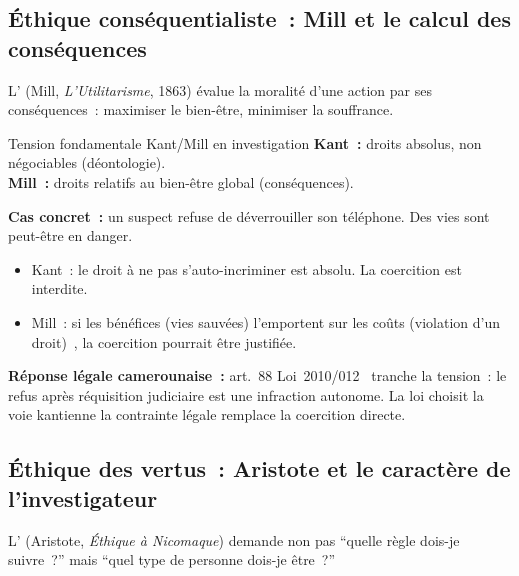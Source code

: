 \subsection{Éthique conséquentialiste~: Mill et le calcul des conséquences}

L' (Mill,
\textit{L'Utilitarisme}, 1863) évalue la moralité d'une action par
ses conséquences~: maximiser le bien-être, minimiser la souffrance.

\begin{boiteRemarque}{Tension fondamentale Kant/Mill en investigation}
\textbf{Kant~:} droits absolus, non négociables (déontologie).\\
\textbf{Mill~:} droits relatifs au bien-être global (conséquences).

\textbf{Cas concret~:} un suspect refuse de déverrouiller son téléphone.
Des vies sont peut-être en danger.
\begin{itemize}
    \item Kant~: le droit à ne pas s'auto-incriminer est absolu.
          La coercition est interdite.
    \item Mill~: si les bénéfices (vies sauvées) l'emportent sur
          les coûts (violation d'un droit)~, la coercition pourrait
          être justifiée.
\end{itemize}
\textbf{Réponse légale camerounaise~:} art.~88 Loi~2010/012~\cite{cameroun2010a} tranche
la tension~: le refus après réquisition judiciaire est une infraction
autonome. La loi choisit la voie kantienne la contrainte légale
remplace la coercition directe.
\end{boiteRemarque}

\subsection{Éthique des vertus~: Aristote et le caractère de l'investigateur}

L' (Aristote,
\textit{Éthique à Nicomaque}) demande non pas ``quelle règle dois-je
suivre~?'' mais ``quel type de personne dois-je être~?''

